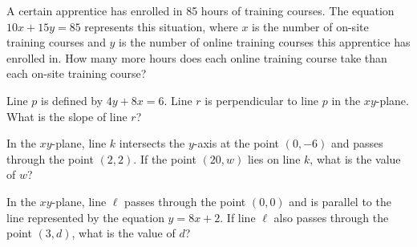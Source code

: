 \vspace{0.75em}


\vspace{2em}

\noindent\markforreview

\vspace{1em}

A certain apprentice has enrolled in 85 hours of training courses. The equation $10x + 15y = 85$ represents this situation, where $x$ is the number of on-site training courses and $y$ is the number of online training courses this apprentice has enrolled in. How many more hours does each online training course take than each on-site training course?

\newpage
\noindent\markforreview

\vspace{1em}

Line $p$ is defined by $4y + 8x = 6$. Line $r$ is perpendicular to line $p$ in the $xy$-plane. What is the slope of line $r$?


\vspace{15em}

\noindent\markforreview

\vspace{1em}

In the $xy$-plane, line $k$ intersects the $y$-axis at the point $(0, -6)$ and passes through the point $(2, 2)$. If the point $(20, w)$ lies on line $k$, what is the value of $w$?


\vspace{15em}

\noindent\markforreview

\vspace{1em}

In the $xy$-plane, line $\ell$ passes through the point $(0, 0)$ and is parallel to the line represented by the equation $y = 8x + 2$. If line $\ell$ also passes through the point $(3, d)$, what is the value of $d$?

\vspace{2em}

\newpage
\noindent\markforreview

